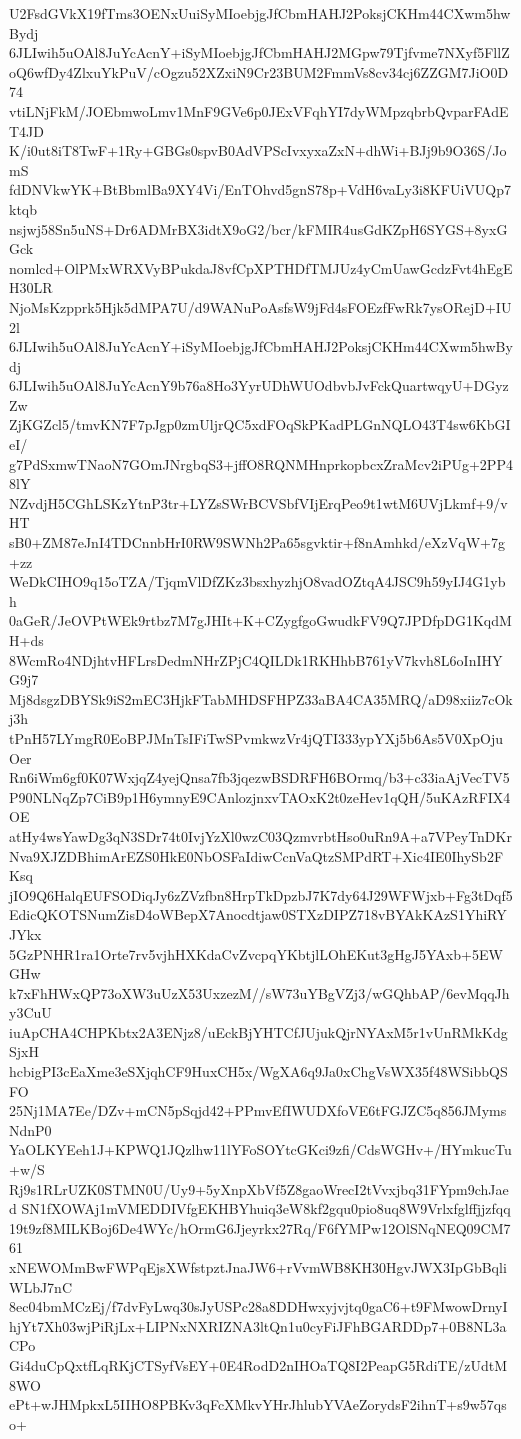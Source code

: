 U2FsdGVkX19fTms3OENxUuiSyMIoebjgJfCbmHAHJ2PoksjCKHm44CXwm5hwBydj
6JLIwih5uOAl8JuYcAcnY+iSyMIoebjgJfCbmHAHJ2MGpw79Tjfvme7NXyf5FllZ
oQ6wfDy4ZlxuYkPuV/cOgzu52XZxiN9Cr23BUM2FmmVs8cv34cj6ZZGM7JiO0D74
vtiLNjFkM/JOEbmwoLmv1MnF9GVe6p0JExVFqhYI7dyWMpzqbrbQvparFAdET4JD
K/i0ut8iT8TwF+1Ry+GBGs0spvB0AdVPScIvxyxaZxN+dhWi+BJj9b9O36S/JomS
fdDNVkwYK+BtBbmlBa9XY4Vi/EnTOhvd5gnS78p+VdH6vaLy3i8KFUiVUQp7ktqb
nsjwj58Sn5uNS+Dr6ADMrBX3idtX9oG2/bcr/kFMIR4usGdKZpH6SYGS+8yxGGck
nomlcd+OlPMxWRXVyBPukdaJ8vfCpXPTHDfTMJUz4yCmUawGcdzFvt4hEgEH30LR
NjoMsKzpprk5Hjk5dMPA7U/d9WANuPoAsfsW9jFd4sFOEzfFwRk7ysORejD+IU2l
6JLIwih5uOAl8JuYcAcnY+iSyMIoebjgJfCbmHAHJ2PoksjCKHm44CXwm5hwBydj
6JLIwih5uOAl8JuYcAcnY9b76a8Ho3YyrUDhWUOdbvbJvFckQuartwqyU+DGyzZw
ZjKGZcl5/tmvKN7F7pJgp0zmUljrQC5xdFOqSkPKadPLGnNQLO43T4sw6KbGIeI/
g7PdSxmwTNaoN7GOmJNrgbqS3+jffO8RQNMHnprkopbcxZraMcv2iPUg+2PP48lY
NZvdjH5CGhLSKzYtnP3tr+LYZsSWrBCVSbfVIjErqPeo9t1wtM6UVjLkmf+9/vHT
sB0+ZM87eJnI4TDCnnbHrI0RW9SWNh2Pa65sgvktir+f8nAmhkd/eXzVqW+7g+zz
WeDkCIHO9q15oTZA/TjqmVlDfZKz3bsxhyzhjO8vadOZtqA4JSC9h59yIJ4G1ybh
0aGeR/JeOVPtWEk9rtbz7M7gJHIt+K+CZygfgoGwudkFV9Q7JPDfpDG1KqdMH+ds
8WcmRo4NDjhtvHFLrsDedmNHrZPjC4QILDk1RKHhbB761yV7kvh8L6oInIHYG9j7
Mj8dsgzDBYSk9iS2mEC3HjkFTabMHDSFHPZ33aBA4CA35MRQ/aD98xiiz7cOkj3h
tPnH57LYmgR0EoBPJMnTsIFiTwSPvmkwzVr4jQTI333ypYXj5b6As5V0XpOjuOer
Rn6iWm6gf0K07WxjqZ4yejQnsa7fb3jqezwBSDRFH6BOrmq/b3+c33iaAjVecTV5
P90NLNqZp7CiB9p1H6ymnyE9CAnlozjnxvTAOxK2t0zeHev1qQH/5uKAzRFIX4OE
atHy4wsYawDg3qN3SDr74t0IvjYzXl0wzC03QzmvrbtHso0uRn9A+a7VPeyTnDKr
Nva9XJZDBhimArEZS0HkE0NbOSFaIdiwCcnVaQtzSMPdRT+Xic4IE0IhySb2FKsq
jIO9Q6HalqEUFSODiqJy6zZVzfbn8HrpTkDpzbJ7K7dy64J29WFWjxb+Fg3tDqf5
EdicQKOTSNumZisD4oWBepX7Anocdtjaw0STXzDIPZ718vBYAkKAzS1YhiRYJYkx
5GzPNHR1ra1Orte7rv5vjhHXKdaCvZvcpqYKbtjlLOhEKut3gHgJ5YAxb+5EWGHw
k7xFhHWxQP73oXW3uUzX53UxzezM//sW73uYBgVZj3/wGQhbAP/6evMqqJhy3CuU
iuApCHA4CHPKbtx2A3ENjz8/uEckBjYHTCfJUjukQjrNYAxM5r1vUnRMkKdgSjxH
hcbigPI3cEaXme3eSXjqhCF9HuxCH5x/WgXA6q9Ja0xChgVsWX35f48WSibbQSFO
25Nj1MA7Ee/DZv+mCN5pSqjd42+PPmvEfIWUDXfoVE6tFGJZC5q856JMymsNdnP0
YaOLKYEeh1J+KPWQ1JQzlhw11lYFoSOYtcGKci9zfi/CdsWGHv+/HYmkucTu+w/S
Rj9s1RLrUZK0STMN0U/Uy9+5yXnpXbVf5Z8gaoWrecI2tVvxjbq31FYpm9chJaed
SN1fXOWAj1mVMEDDIVfgEKHBYhuiq3eW8kf2gqu0pio8uq8W9Vrlxfglffjjzfqq
19t9zf8MILKBoj6De4WYc/hOrmG6Jjeyrkx27Rq/F6fYMPw12OlSNqNEQ09CM761
xNEWOMmBwFWPqEjsXWfstpztJnaJW6+rVvmWB8KH30HgvJWX3IpGbBqliWLbJ7nC
8ec04bmMCzEj/f7dvFyLwq30sJyUSPc28a8DDHwxyjvjtq0gaC6+t9FMwowDrnyI
hjYt7Xh03wjPiRjLx+LIPNxNXRIZNA3ltQn1u0cyFiJFhBGARDDp7+0B8NL3aCPo
Gi4duCpQxtfLqRKjCTSyfVsEY+0E4RodD2nIHOaTQ8I2PeapG5RdiTE/zUdtM8WO
ePt+wJHMpkxL5IIHO8PBKv3qFcXMkvYHrJhlubYVAeZorydsF2ihnT+s9w57qso+
